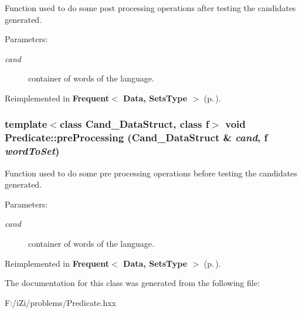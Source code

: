 Function used to do some post processing operations after testing the candidates generated. 

\begin{Desc}
\item[Parameters:]
\begin{description}
\item[{\em cand}]container of words of the language. \end{description}
\end{Desc}


Reimplemented in {\bf Frequent$<$ Data, Sets\-Type $>$} {\rm (p.\,\pageref{class_frequent_ff29167beb828195c34e10881abb2f74})}.
\subsubsection{\setlength{\rightskip}{0pt plus 5cm}template$<$class Cand\_\-Data\-Struct, class f$>$ void Predicate::pre\-Processing (Cand\_\-Data\-Struct \& {\em cand}, f {\em word\-To\-Set})\hspace{0.3cm}{\tt  [inline]}}\label{class_predicate_8ee59d790e9b46e5e0555dbeb5b91f95}


Function used to do some pre processing operations before testing the candidates generated. 

\begin{Desc}
\item[Parameters:]
\begin{description}
\item[{\em cand}]container of words of the language. \end{description}
\end{Desc}


Reimplemented in {\bf Frequent$<$ Data, Sets\-Type $>$} {\rm (p.\,\pageref{class_frequent_236bb06ebfac503436c8a25a8507b467})}.

The documentation for this class was generated from the following file:\begin{CompactItemize}
\item 
F:/i\-Zi/problems/Predicate.hxx\end{CompactItemize}
